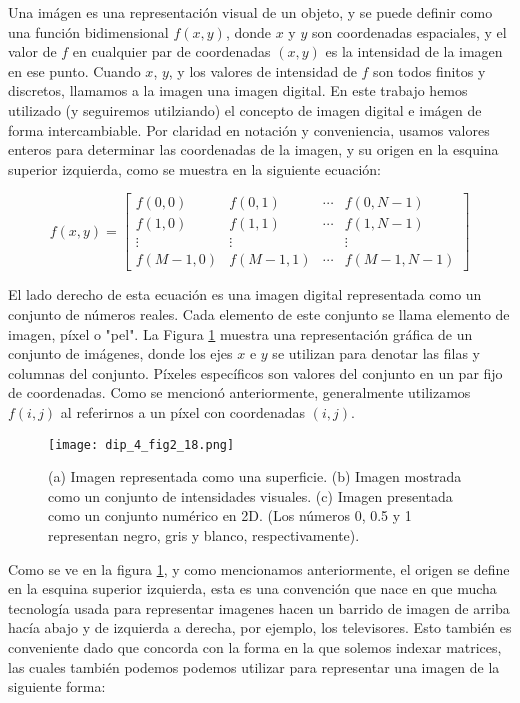 Una im\'agen es una representaci\'on visual de un objeto, y se puede definir como una funci\'on bidimensional $f(x,y)$, donde $x$ y $y$ son coordenadas espaciales, y el valor de $f$ en cualquier par de coordenadas $(x,y)$ es la intensidad de la imagen en ese punto. Cuando $x$, $y$, y los valores de intensidad de $f$ son todos finitos y discretos, llamamos a la imagen una imagen digital. En este trabajo hemos utilizado (y seguiremos utilziando) el concepto de imagen digital e im\'agen de forma intercambiable. Por claridad en notaci\'on y conveniencia, usamos valores enteros para determinar las coordenadas de la imagen, y su origen en la esquina superior izquierda, como se muestra en la siguiente ecuaci\'on:

$$
f(x, y)=\left[\begin{array}{cccc}
f(0,0) & f(0,1) & \cdots & f(0, N-1) \\
f(1,0) & f(1,1) & \cdots & f(1, N-1) \\
\vdots & \vdots & & \vdots \\
f(M-1,0) & f(M-1,1) & \cdots & f(M-1, N-1)
\end{array}\right]
$$

El lado derecho de esta ecuación es una imagen digital representada como un conjunto de números reales. Cada elemento de este conjunto se llama elemento de imagen, píxel o "pel". La Figura \ref{fig:dip_2_18} muestra una representación gráfica de un conjunto de imágenes, donde los ejes $x$ e $y$ se utilizan para denotar las filas y columnas del conjunto. Píxeles específicos son valores del conjunto en un par fijo de coordenadas. Como se mencionó anteriormente, generalmente utilizamos $f(i, j)$ al referirnos a un píxel con coordenadas $(i, j)$.


\begin{figure}[H]
    \centering
    \texttt{[image: dip\_4\_fig2\_18.png]}
    \caption{
        (a) Imagen representada como una superficie.
        (b) Imagen mostrada como un conjunto de intensidades visuales.
        (c) Imagen presentada como un conjunto numérico en 2D. (Los números 0, 0.5 y 1 representan negro, gris y blanco, respectivamente).}
    \label{fig:dip_2_18}
\end{figure}

Como se ve en la figura \ref{fig:dip_2_18}, y como mencionamos anteriormente, el origen se define en la esquina superior izquierda, esta es una convenci\'on que nace en que mucha tecnolog\'ia usada para representar imagenes hacen un barrido de imagen de arriba hacía abajo y de izquierda a derecha, por ejemplo, los televisores. Esto tambi\'en es conveniente dado que concorda con la forma en la que solemos indexar matrices, las cuales tambi\'en podemos podemos utilizar para representar una imagen  de la siguiente forma:

